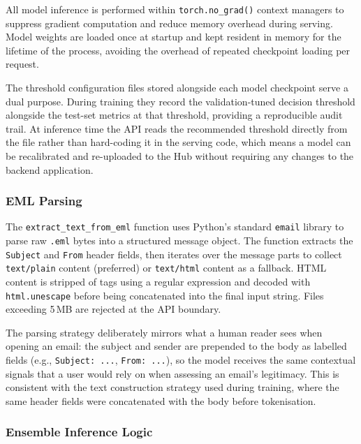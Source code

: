 All model inference is performed within \texttt{torch.no\_grad()} context managers to suppress gradient computation and reduce memory overhead during serving. Model weights are loaded once at startup and kept resident in memory for the lifetime of the process, avoiding the overhead of repeated checkpoint loading per request.

The threshold configuration files stored alongside each model checkpoint serve a dual purpose. During training they record the validation-tuned decision threshold alongside the test-set metrics at that threshold, providing a reproducible audit trail. At inference time the \ac{API} reads the recommended threshold directly from the file rather than hard-coding it in the serving code, which means a model can be recalibrated and re-uploaded to the Hub without requiring any changes to the backend application.

\subsubsection{EML Parsing}

The \texttt{extract\_text\_from\_eml} function uses Python's standard \texttt{email} library to parse raw \texttt{.eml} bytes into a structured message object. The function extracts the \texttt{Subject} and \texttt{From} header fields, then iterates over the message parts to collect \texttt{text/plain} content (preferred) or \texttt{text/html} content as a fallback. \ac{HTML} content is stripped of tags using a regular expression and decoded with \texttt{html.unescape} before being concatenated into the final input string. Files exceeding 5\,MB are rejected at the \ac{API} boundary.

The parsing strategy deliberately mirrors what a human reader sees when opening an email: the subject and sender are prepended to the body as labelled fields (e.g., \texttt{Subject: ...}, \texttt{From: ...}), so the model receives the same contextual signals that a user would rely on when assessing an email's legitimacy. This is consistent with the text construction strategy used during training, where the same header fields were concatenated with the body before tokenisation.

\subsubsection{Ensemble Inference Logic}

